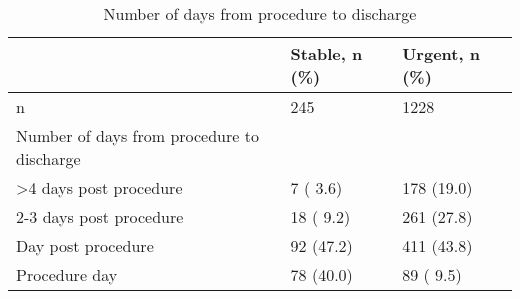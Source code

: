 \documentclass[
]{article}
\begin{document}
\begin{longtable}[t]{lll}
\caption{\label{tab:table 46}Number of days from procedure to discharge}\\
\toprule
 & Stable, n (\%) & Urgent, n (\%)\\
\midrule
n & 245 & 1228\\
Number of days from procedure to discharge &  & \\
\hspace{1em}>4 days post procedure & 7 ( 3.6) & 178 (19.0)\\
\hspace{1em}2-3 days post procedure & 18 ( 9.2) & 261 (27.8)\\
\hspace{1em}Day post procedure & 92 (47.2) & 411 (43.8)\\
\addlinespace
\hspace{1em}Procedure day & 78 (40.0) & 89 ( 9.5)\\
\bottomrule
\end{longtable}
\end{document}
